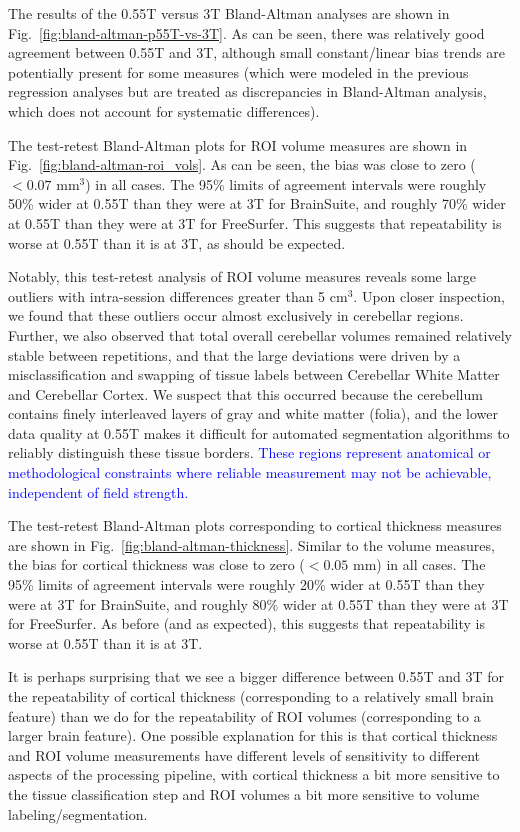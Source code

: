 \documentclass[12pt,letterpaper,onecolumn]{article}
\newcommand{\mycomment}[1]
{\todo[caption={#1},color=red!100!green!33,noline]{\color{black} \begin{spacing}{0.5}#1\vspace{-0.5em}\end{spacing}}}
\begin{document}
The results of the 0.55T versus 3T Bland-Altman analyses are shown in {\color{.}Fig.~\ref{fig:bland-altman-p55T-vs-3T}}. As can be seen, there was relatively good agreement between 0.55T and 3T, although small constant/linear bias trends are potentially present for some measures (which were modeled in the previous regression analyses but are treated as discrepancies in Bland-Altman analysis, which does not account for systematic differences).



The test-retest Bland-Altman plots for ROI volume measures are shown in Fig.~\ref{fig:bland-altman-roi_vols}.  As can be seen, the bias was close to zero ($< 0.07$ mm$^3$) in all cases.    The 95\% limits of agreement intervals were roughly 50\% wider at 0.55T than they were at 3T for BrainSuite, and roughly 70\% wider at 0.55T than they were at 3T for FreeSurfer.  This suggests that repeatability is worse at 0.55T than it is at 3T, as should be expected. 

{\color{.}Notably, this test-retest analysis of ROI volume measures reveals some large outliers with intra-session differences greater than 5 cm$^3$.  Upon closer inspection, we found that these outliers occur almost exclusively in cerebellar regions.  Further, we also observed that total overall cerebellar volumes remained relatively stable between repetitions, and that the large deviations were driven by a misclassification and swapping of tissue labels between Cerebellar White Matter and Cerebellar Cortex. We suspect that this occurred because the cerebellum contains finely interleaved layers of gray and white matter (folia), and the lower data quality at 0.55T makes it difficult for automated segmentation algorithms to reliably distinguish these tissue borders.} \textcolor{blue}{These regions represent anatomical or methodological constraints where reliable measurement may not be achievable, independent of field strength.\mycomment{R1.3}}

The test-retest Bland-Altman plots corresponding to cortical thickness measures are shown in Fig.~\ref{fig:bland-altman-thickness}. Similar to the volume measures, the bias for cortical thickness was close to zero ($< 0.05$ mm) in all cases.   The 95\% limits of agreement intervals were roughly 20\% wider at 0.55T than they were at 3T for BrainSuite, and roughly 80\% wider at 0.55T than they were at 3T for FreeSurfer.  As before (and as expected), this suggests that repeatability is worse at 0.55T than it is at 3T. 

It is perhaps surprising that we see a bigger difference between 0.55T and 3T for the repeatability of cortical thickness (corresponding to a relatively small brain feature) than we do for the repeatability of ROI volumes (corresponding to a larger brain feature).  One possible explanation for this is that cortical thickness and ROI volume measurements have different levels of sensitivity to different aspects of the processing pipeline, with cortical thickness a bit more sensitive to the tissue classification step and ROI volumes a bit more sensitive to volume labeling/segmentation.   
\end{document}

